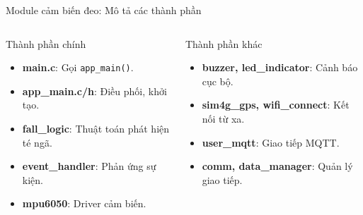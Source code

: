 \begin{frame}{Module cảm biến đeo: Mô tả các thành phần}
    \begin{columns}[t]
        \begin{column}{0.48\textwidth}
            \begin{block}{Thành phần chính}
                \begin{itemize}
                    \item \textbf{main.c}: Gọi \texttt{app\_main()}.
                    \item \textbf{app\_main.c/h}: Điều phối, khởi tạo.
                    \item \textbf{fall\_logic}: Thuật toán phát hiện té ngã.
                    \item \textbf{event\_handler}: Phản ứng sự kiện.
                    \item \textbf{mpu6050}: Driver cảm biến.
                \end{itemize}
            \end{block}
        \end{column}
        \begin{column}{0.48\textwidth}
            \begin{block}{Thành phần khác}
                \begin{itemize}
                    \item \textbf{buzzer, led\_indicator}: Cảnh báo cục bộ.
                    \item \textbf{sim4g\_gps, wifi\_connect}: Kết nối từ xa.
                    \item \textbf{user\_mqtt}: Giao tiếp MQTT.
                    \item \textbf{comm, data\_manager}: Quản lý giao tiếp.
                \end{itemize}
            \end{block}
        \end{column}
    \end{columns}
\end{frame}

